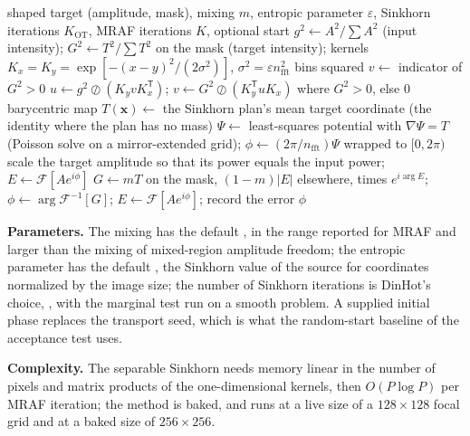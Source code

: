 \begin{algorithm}[t]
\caption{Optimal-transport seed by the separable Sinkhorn iteration, followed by the mixed-region iteration of Eq.~\eqref{eq:m08}.}
\label{alg:m18}
\begin{algorithmic}[1]
\Require shaped target (amplitude, mask), mixing $m$, entropic parameter $\varepsilon$, Sinkhorn iterations $K_{\mathrm{OT}}$, MRAF iterations $K$, optional start
  \State $g^2\gets A^2/\sum A^2$ (input intensity); $G^2\gets T^2/\sum T^2$ on the mask (target intensity); kernels $K_x=K_y=\exp[-(x-y)^2/(2\sigma^2)]$, $\sigma^2=\varepsilon n_{\mathrm{fft}}^2$ bins squared
  \State $v\gets$ indicator of $G^2>0$
    \State $u\gets g^2\oslash(K_yvK_x^{\mathsf T})$; $v\gets G^2\oslash(K_y^{\mathsf T}uK_x)$ where $G^2>0$, else $0$
  \EndFor
  \State barycentric map $T(\mathbf x)\gets$ the Sinkhorn plan's mean target coordinate (the identity where the plan has no mass)
  \State $\Psi\gets$ least-squares potential with $\nabla\Psi=T$ (Poisson solve on a mirror-extended grid); $\phi\gets(2\pi/n_{\mathrm{fft}})\Psi$ wrapped to $[0,2\pi)$
\EndIf
\State scale the target amplitude so that its power equals the input power; $E\gets\mathcal F[Ae^{i\phi}]$
  \State $G\gets mT$ on the mask, $(1-m)|E|$ elsewhere, times $e^{i\arg E}$; $\phi\gets\arg\mathcal F^{-1}[G]$; $E\gets\mathcal F[Ae^{i\phi}]$; record the error
\EndFor
\State \Return $\phi$
\end{algorithmic}
\end{algorithm}

\textbf{Parameters.} The mixing has the default , in the range reported for MRAF and larger than the mixing of mixed-region amplitude freedom; the entropic parameter has the default , the Sinkhorn value of the source for coordinates normalized by the image size; the number of Sinkhorn iterations is DinHot's choice, , with the marginal test run on a smooth problem. A supplied initial phase replaces the transport seed, which is what the random-start baseline of the acceptance test uses.

\textbf{Complexity.} The separable Sinkhorn needs memory linear in the number of pixels and matrix products of the one-dimensional kernels, then $O(P\log P)$ per MRAF iteration; the method is baked, and runs at a live size of a $128\times128$ focal grid and at a baked size of $256\times256$.

